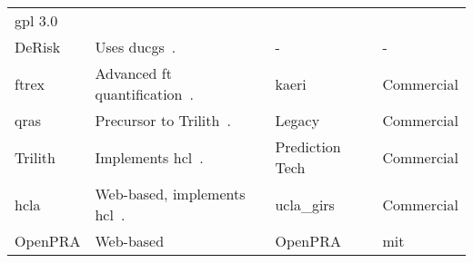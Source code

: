 \begin{table}
\begin{tabular}{@{}llll@{}}
  \acrshort{gpl} 3.0 \\
DeRisk &
  Uses \acrlong{ducg}s~\cite{derisk1}. &
  - &
  - \\
\acrshort{ftrex} &
  Advanced \acrlong{ft} quantification~\cite{ftrex_manual}. &
  \acrshort{kaeri} &
  Commercial \\
\acrshort{qras} &
  Precursor to Trilith~\cite{qras}. &
  Legacy &
  Commercial \\
Trilith &
  Implements \acrfull{hcl}~\cite{hcl_method}. &
  Prediction Tech&
  Commercial \\
\acrshort{hcla} &
  Web-based, implements \acrshort{hcl}~\cite{hcla_cmd,hcla_web}. &
  \acrshort{ucla_girs} &
  Commercial \\
OpenPRA &
  Web-based \cite{earthperson_introducing_2023} &
  OpenPRA &
  \acrshort{mit} \\
\end{tabular}
\end{table}